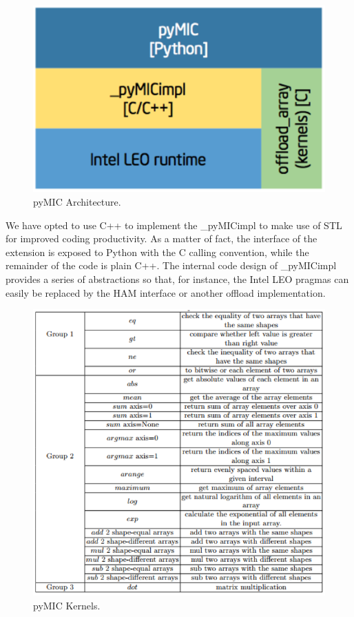 \documentclass[12pt]{article}
\begin{document}
\begin{figure}[H]
\centering
\includegraphics[scale = 0.9]{chainer27.png}
\caption{pyMIC Architecture.}
\end{figure}
We have opted to use C++ to implement the \_pyMICimpl to make use of STL for improved coding productivity. As a matter of fact, the interface of the extension is exposed to Python with the C calling convention, while the remainder of the code is plain C++. The internal code design of \_pyMICimpl provides a series of abstractions so that, for instance, the Intel LEO pragmas can easily be replaced by the HAM interface or another offload implementation.
\begin{figure}[H]
\centering
\includegraphics[scale = 0.9]{chainer28.png}
\caption{pyMIC Kernels.}
\end{figure}
\end{document}
